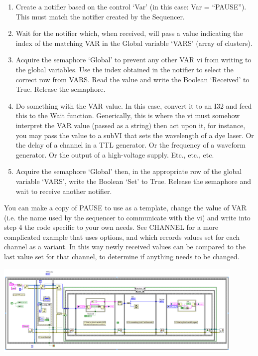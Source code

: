 \documentclass[10pt,a4paper]{article}
\begin{document}
\begin{enumerate}
	\item %
	Create a notifier based on the control `Var' (in this case: Var = ``PAUSE'').  This must match the notifier created by the Sequencer.
	\item %
	Wait for the notifier which, when received, will pass a value indicating the index of the matching VAR in the Global variable `VARS' (array of clusters).
	\item %
	Acquire the semaphore `Global' to prevent any other VAR vi from writing to the global variables.  Use the index obtained in the notifier to select the correct row from VARS.  Read the value and write the Boolean `Received' to True.  Release the semaphore.
	\item %
	Do something with the VAR value.  In this case, convert it to an I32 and feed this to the  Wait function.  Generically, this is where the vi must somehow interpret the VAR value (passed as a string) then act upon it, for instance, you may pass the value to a subVI that sets the wavelength of a dye laser. Or the delay of a channel in a TTL generator. Or the frequency of a waveform generator. Or the output of a high-voltage supply. Etc., etc., etc.
	\item %
	Acquire the semaphore `Global' then, in the appropriate row of the global variable `VARS', write the Boolean `Set' to True.   Release the semaphore and wait to receive another notifier.
\end{enumerate} 

You can make a copy of PAUSE to use as a template, change the value of VAR (i.e. the name used by the sequencer to communicate with the vi) and write into step 4 the code specific to your own needs.  See CHANNEL for a more complicated example that uses options, and which records values set for each channel as a variant.  In this way newly received values can be compared to the last value set for that channel, to determine if anything needs to be changed.

\includegraphics[width=0.9\textwidth]{images/var_block.png}
\end{document}
